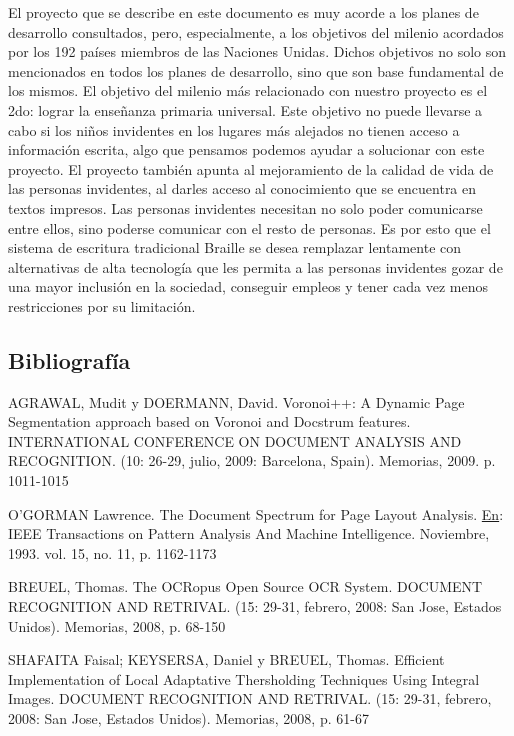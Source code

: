 \documentclass[a4paper, 12pt, oneside]{article}
\begin{document}
	El proyecto que se describe en este documento es muy acorde a los planes de desarrollo consultados, pero, especialmente, a los objetivos del milenio acordados por los 192 países miembros de las Naciones Unidas. Dichos objetivos no solo son mencionados en todos los planes de desarrollo, sino que son base fundamental de los mismos. El objetivo del milenio más relacionado con nuestro proyecto es el 2do: lograr la enseñanza primaria universal. Este objetivo no puede llevarse a cabo si los niños invidentes en los lugares más alejados no tienen acceso a información escrita, algo que pensamos podemos ayudar a solucionar con este proyecto.
	El proyecto también apunta al mejoramiento de la calidad de vida de las personas invidentes, al darles
	acceso al conocimiento que se encuentra en textos impresos. Las personas invidentes necesitan no solo
	poder comunicarse entre ellos, sino poderse comunicar con el resto de personas. Es por esto que el sistema
	de escritura tradicional Braille se desea remplazar lentamente con alternativas de alta tecnología
	que les permita a las personas invidentes gozar de una mayor inclusión en la sociedad, conseguir empleos
	y tener cada vez menos restricciones por su limitación.
	
	\clearpage
	\begin{center}
	\section{Bibliografía}
	\end{center}
	AGRAWAL, Mudit y DOERMANN, David. Voronoi++: A Dynamic Page Segmentation approach based on Voronoi and Docstrum features. INTERNATIONAL CONFERENCE ON DOCUMENT ANALYSIS AND RECOGNITION. (10: 26-29, julio, 2009: Barcelona, Spain). Memorias, 2009. p. 1011-1015
	
	O'GORMAN Lawrence. The Document Spectrum for Page Layout Analysis. \underline{En}: IEEE Transactions on Pattern Analysis And Machine Intelligence. Noviembre, 1993. vol. 15, no. 11, p. 1162-1173
	
	BREUEL, Thomas. The OCRopus Open Source OCR System. DOCUMENT RECOGNITION AND RETRIVAL. (15: 29-31, febrero, 2008: San Jose, Estados Unidos). Memorias, 2008, p. 68-150
	
	SHAFAITA Faisal; KEYSERSA, Daniel y BREUEL, Thomas. Efficient Implementation of Local Adaptative Thersholding Techniques Using Integral Images. DOCUMENT RECOGNITION AND RETRIVAL. (15: 29-31, febrero, 2008: San Jose, Estados Unidos). Memorias, 2008, p. 61-67
	
\end{document}
